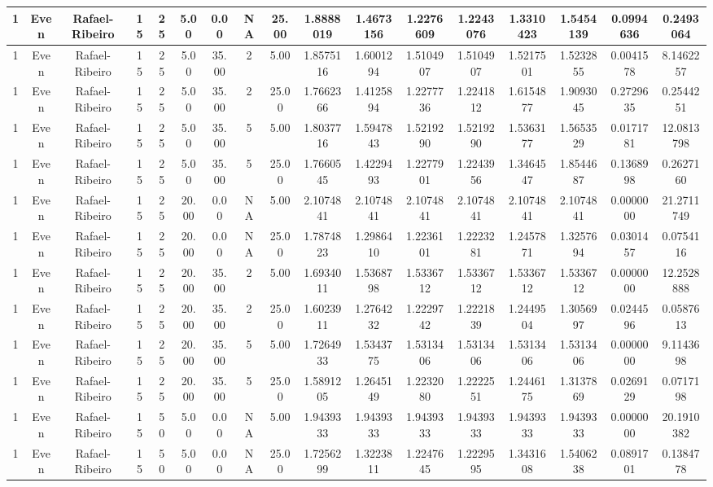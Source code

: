 \begin{longtable}{ | c | c | c | c | c | c | c | c | c | c | c | c | c | c | c | c | c | }
	\hline
	1	&	Even	&	Rafael-Ribeiro	&	15	&	25	&	5.00	&	0.00	&	NA	&	25.00	&	1.8888019	&	1.4673156	&	1.2276609	&	1.2243076	&	1.3310423	&	1.5454139	&	0.0994636	&	0.2493064 \\
	\hline
	1	&	Even	&	Rafael-Ribeiro	&	15	&	25	&	5.00	&	35.00	&	2	&	5.00	&	1.8575116	&	1.6001294	&	1.5104907	&	1.5104907	&	1.5217501	&	1.5232855	&	0.0041578	&	8.1462257 \\
	\hline
	1	&	Even	&	Rafael-Ribeiro	&	15	&	25	&	5.00	&	35.00	&	2	&	25.00	&	1.7662366	&	1.4125894	&	1.2277736	&	1.2241812	&	1.6154877	&	1.9093045	&	0.2729635	&	0.2544251 \\
	\hline
	1	&	Even	&	Rafael-Ribeiro	&	15	&	25	&	5.00	&	35.00	&	5	&	5.00	&	1.8037716	&	1.5947843	&	1.5219290	&	1.5219290	&	1.5363177	&	1.5653529	&	0.0171781	&	12.0813798 \\
	\hline
	1	&	Even	&	Rafael-Ribeiro	&	15	&	25	&	5.00	&	35.00	&	5	&	25.00	&	1.7660545	&	1.4229493	&	1.2277901	&	1.2243956	&	1.3464547	&	1.8544687	&	0.1368998	&	0.2627160 \\
	\hline
	1	&	Even	&	Rafael-Ribeiro	&	15	&	25	&	20.00	&	0.00	&	NA	&	5.00	&	2.1074841	&	2.1074841	&	2.1074841	&	2.1074841	&	2.1074841	&	2.1074841	&	0.0000000	&	21.2711749 \\
	\hline
	1	&	Even	&	Rafael-Ribeiro	&	15	&	25	&	20.00	&	0.00	&	NA	&	25.00	&	1.7874823	&	1.2986410	&	1.2236101	&	1.2223281	&	1.2457871	&	1.3257694	&	0.0301457	&	0.0754116 \\
	\hline
	1	&	Even	&	Rafael-Ribeiro	&	15	&	25	&	20.00	&	35.00	&	2	&	5.00	&	1.6934011	&	1.5368798	&	1.5336712	&	1.5336712	&	1.5336712	&	1.5336712	&	0.0000000	&	12.2528888 \\
	\hline
	1	&	Even	&	Rafael-Ribeiro	&	15	&	25	&	20.00	&	35.00	&	2	&	25.00	&	1.6023911	&	1.2764232	&	1.2229742	&	1.2221839	&	1.2449504	&	1.3056997	&	0.0244596	&	0.0587613 \\
	\hline
	1	&	Even	&	Rafael-Ribeiro	&	15	&	25	&	20.00	&	35.00	&	5	&	5.00	&	1.7264933	&	1.5343775	&	1.5313406	&	1.5313406	&	1.5313406	&	1.5313406	&	0.0000000	&	9.1143698 \\
	\hline
	1	&	Even	&	Rafael-Ribeiro	&	15	&	25	&	20.00	&	35.00	&	5	&	25.00	&	1.5891205	&	1.2645149	&	1.2232080	&	1.2222551	&	1.2446175	&	1.3137869	&	0.0269129	&	0.0717198 \\
	\hline
	1	&	Even	&	Rafael-Ribeiro	&	15	&	50	&	5.00	&	0.00	&	NA	&	5.00	&	1.9439333	&	1.9439333	&	1.9439333	&	1.9439333	&	1.9439333	&	1.9439333	&	0.0000000	&	20.1910382 \\
	\hline
	1	&	Even	&	Rafael-Ribeiro	&	15	&	50	&	5.00	&	0.00	&	NA	&	25.00	&	1.7256299	&	1.3223811	&	1.2247645	&	1.2229595	&	1.3431608	&	1.5406238	&	0.0891701	&	0.1384778 \\

\end{longtable}
